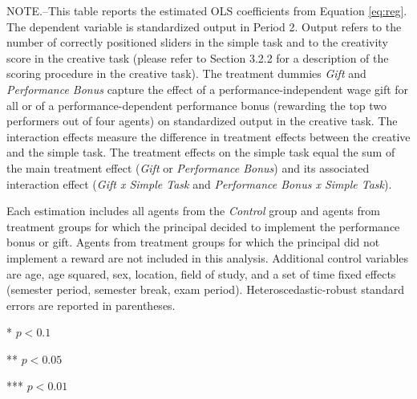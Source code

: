 \begin{table}[h]
\begin{center}
{\begin{minipage}{\textwidth}
\footnotesize NOTE.--This table reports the estimated OLS coefficients from Equation \ref{eq:reg}. 
The dependent variable is standardized output in Period 2. Output refers to the number of correctly positioned sliders in the simple task and to the creativity score in the creative task (please refer to Section 3.2.2 for a description of the scoring procedure in the creative task). 
The treatment dummies \textit{Gift} and \textit{Performance Bonus} capture the effect of a performance-independent wage gift for all or of a performance-dependent performance bonus (rewarding the top two performers out of four agents) on standardized output in the creative task. 
The interaction effects measure the difference in treatment effects between the creative and the simple task. The treatment effects on the simple task equal the sum of the main treatment effect (\textit{Gift} or \textit{Performance Bonus}) and its associated interaction effect (\textit{Gift x Simple Task} and \textit{Performance Bonus x Simple Task}). 

Each estimation includes all agents from the \textit{Control} group and agents from treatment groups for which the principal decided to implement the performance bonus or gift. Agents from treatment groups for which the principal did not implement a reward are not included in this analysis. 
Additional control variables are age, age squared, sex, location, field of study, and a set of time fixed effects (semester period, semester break, exam period). 
Heteroscedastic-robust standard errors are reported in parentheses. 

*   $ p < 0.1  $

**  $ p < 0.05 $

*** $ p < 0.01 $
\end{minipage}}
\end{center}
\label{tab:EQ_Pooled_Results}
\end{table}
